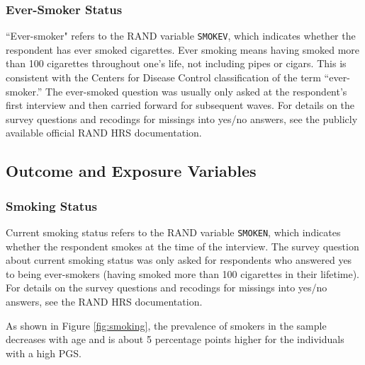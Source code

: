 \subsubsection{Ever-Smoker Status}
\label{supsec:ever_smoking}
``Ever-smoker" refers to the RAND variable {\tt SMOKEV}, which indicates whether the respondent has ever smoked cigarettes. Ever smoking means having smoked more than 100 cigarettes throughout one's life, not including pipes or cigars. This is consistent with the Centers for Disease Control classification of the term ``ever-smoker.''\cite{Jamal2016} The ever-smoked question was usually only asked at the respondent's first interview and then carried forward for subsequent waves. For details on the survey questions and recodings for missings into yes/no answers, see the publicly available official RAND HRS documentation.%


\subsection{Outcome and Exposure Variables}
\label{supsec:outcome_exposure}

\subsubsection{Smoking Status}
\label{supsec:smoken}
Current smoking status refers to the RAND variable {\tt SMOKEN}, which indicates whether the respondent smokes at the time of the interview. The survey question about current smoking status was only asked for respondents who answered yes to being ever-smokers (having smoked more than 100 cigarettes in their lifetime). For details on the survey questions and recodings for missings into yes/no answers, see the RAND HRS documentation. %

As shown in Figure \ref{fig:smoking}, the prevalence of smokers in the sample decreases with age and is about 5 percentage points higher for the individuals with a high PGS.

